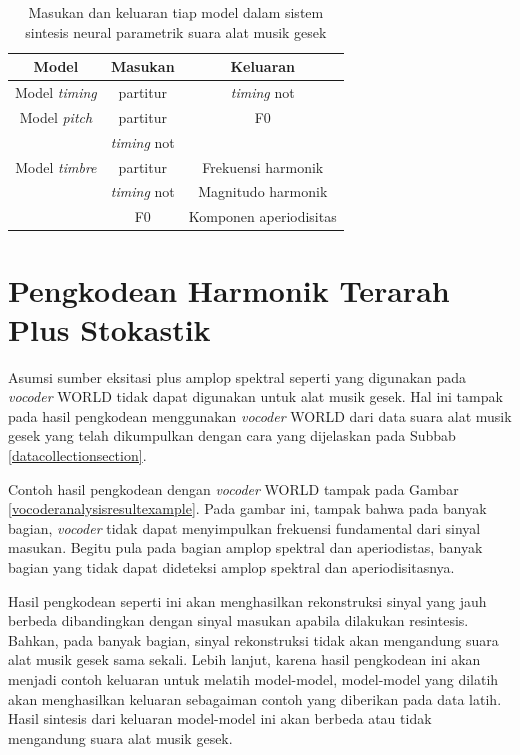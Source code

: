 \begin{table}[h]
    \centering
    \caption{Masukan dan keluaran tiap model dalam sistem sintesis neural parametrik suara alat musik gesek }\label{tab-models-in-out}
    \begin{tabular}{ |c|c|c| } 
     \hline
     Model & Masukan & Keluaran \\
     \hline 
     Model \textit{timing} & partitur & \textit{timing} not  \\ 
     \hline
     Model \textit{pitch} & partitur & F0 \\ 
      & \textit{timing} not  & \\ 
     \hline
     Model \textit{timbre} & partitur   & Frekuensi harmonik \\ 
     & \textit{timing} not & Magnitudo harmonik\\
      & F0 & Komponen aperiodisitas\\ 
     \hline
    \end{tabular}
\end{table}

\section{Pengkodean Harmonik Terarah Plus Stokastik}

Asumsi sumber eksitasi plus amplop spektral seperti yang digunakan pada \textit{vocoder} WORLD tidak dapat digunakan untuk alat musik gesek. Hal ini tampak pada hasil pengkodean menggunakan \textit{vocoder} WORLD dari data suara alat musik gesek yang telah dikumpulkan dengan cara yang dijelaskan pada Subbab \ref{datacollectionsection}.

Contoh hasil pengkodean dengan \textit{vocoder} WORLD tampak pada Gambar \ref{vocoderanalysisresultexample}. Pada gambar ini, tampak bahwa pada banyak bagian, \textit{vocoder} tidak dapat menyimpulkan frekuensi fundamental dari sinyal masukan. Begitu pula pada bagian amplop spektral dan aperiodistas, banyak bagian yang tidak dapat dideteksi amplop spektral dan aperiodisitasnya.

Hasil pengkodean seperti ini akan menghasilkan rekonstruksi sinyal yang jauh berbeda dibandingkan dengan sinyal masukan apabila dilakukan resintesis. Bahkan, pada banyak bagian, sinyal rekonstruksi tidak akan mengandung suara alat musik gesek sama sekali. Lebih lanjut, karena hasil pengkodean ini akan menjadi contoh keluaran untuk melatih model-model, model-model yang dilatih akan menghasilkan keluaran sebagaiman contoh yang diberikan pada data latih. Hasil sintesis dari keluaran model-model ini akan berbeda atau tidak mengandung suara alat musik gesek.

